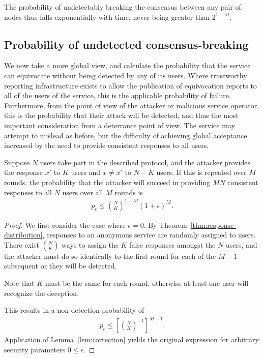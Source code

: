 \documentclass[USenglish]{llncs}
\begin{document}
The probability of undetectably breaking the consensus between any pair
of nodes thus falls exponentially with time, never being greater than $2^{1-M}$.

\subsection{Probability of undetected consensus-breaking}\label{sec:broadcast}

We now take a more global view, and calculate the probability that the service can
equivocate without being detected by any of its users.  Where trustworthy reporting
infrastructure exists to allow the publication of equivocation reports to all of the users
of the service, this is the applicable probability of failure.  Furthermore, from the point
of view of the attacker or malicious service
operator, this is the probability that their attack will be detected, and thus the most
important consideration from a deterrance point of view.
The service may attempt to mislead as before, but the difficulty of achieving global
acceptance increased by the need to provide consistent responses to all users.

\begin{theorem}\label{thm:consistency}
Suppose $N$ users take part in the described protocol, and the attacker
provides the response $x'$ to $K$ users and $x \ne x'$ to $N-K$ users.
If this is repeated over $M$ rounds, the probability that the attacker will
succeed in providing $MN$ consistent responses
to all $N$ users over all $M$ rounds is
\begin{align}
	p_c \le {N \choose K}^{1-M} (1+\epsilon)^M.
\end{align}
\begin{proof}
We first consider the case where $\epsilon = 0$.
	By Theorem~\ref{thm:response-distribution}, responses to an anonymous
	service are randomly assigned to users.  There exist $N\choose K$
	ways to assign the $K$ false responses amongst the $N$ users,
	and the attacker must do so identically to the first round for each
	of the $M-1$ subsequent or they will be detected.
	
	Note that $K$ must be the same for each round, otherwise at least
	one user will recognize the deception.

	This results in a non-detection probability of
	\begin{align}
	p_c \le \left[ {N \choose K}^{-1}\right]^{M-1} .
	\end{align}
	Application of Lemma~\ref{lem:correction} yields the original expression for
arbitrary security parameters $0 \le \epsilon$.
\end{proof}
\end{theorem}
\end{document}
